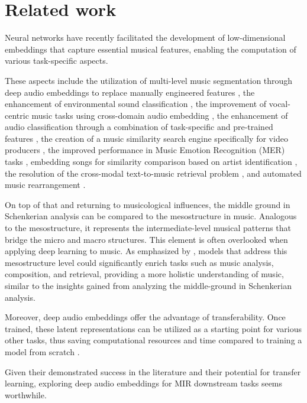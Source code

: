 \section{Related work}

Neural networks have recently facilitated the development of low-dimensional embeddings that capture essential musical features, enabling the computation of various task-specific aspects. 

These aspects include the utilization of multi-level music segmentation through deep audio embeddings to replace manually engineered features \cite{SalamonDeepSegmentation}, the enhancement of environmental sound classification \cite{Kim2020OneStrategies}, the improvement of vocal-centric music tasks using cross-domain audio embedding \cite{Kim2021LearningLoss}, the enhancement of audio classification through a combination of task-specific and pre-trained features \cite{Hung2022Feature-informedClassification}, the creation of a music similarity search engine specifically for video producers \cite{epidemic}, the improved performance in Music Emotion Recognition (MER) tasks \cite{KohComparisonRecognition}, embedding songs for similarity comparison based on artist identification \cite{contentmusicsimtriplet2020}, the resolution of the cross-modal text-to-music retrieval problem \cite{WonEmotionStories}, and automated music rearrangement \cite{Stoller2018IntuitiveTransitions}\cite{Plachouras2023MusicSegmentation}.

On top of that and returning to musicological influences, the middle ground in Schenkerian analysis can be compared to the mesostructure in music. Analogous to the mesostructure, it represents the intermediate-level musical patterns that bridge the micro and macro structures. This element is often overlooked when applying deep learning to music. As emphasized by \cite{Mesostructures2023}, models that address this mesostructure level could significantly enrich tasks such as music analysis, composition, and retrieval, providing a more holistic understanding of music, similar to the insights gained from analyzing the middle-ground in Schenkerian analysis. \cite{Introduction_to_Schenkerian_Analysis}

Moreover, deep audio embeddings offer the advantage of transferability. Once trained, these latent representations can be utilized as a starting point for various other tasks, thus saving computational resources and time compared to training a model from scratch \cite{HamelTransferSimilarity}.

Given their demonstrated success in the literature and their potential for transfer learning, exploring deep audio embeddings for MIR downstream tasks seems worthwhile.
